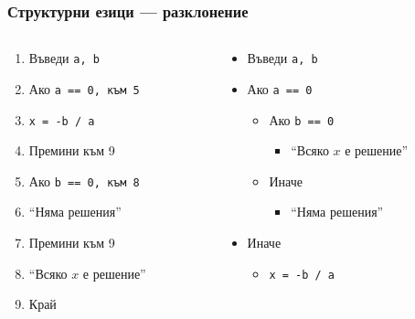 \documentclass{beamer}
\begin{document}
\begin{frame}
  \frametitle{Структурни езици — разклонение}

  \begin{columns}
    \begin{column}{.5\textwidth}
      \begin{enumerate}
      \item Въведи \tt a, \tt b
      \item Ако \tt{a == 0}, към 5
      \item \tt{x = -b / a}
      \item Премини към 9
      \item Ако \tt{b == 0}, към 8
      \item ``Няма решения''
      \item Премини към 9
      \item ``Всяко $x$ е решение''
      \item Край
      \end{enumerate}
    \end{column}
    \begin{column}{.5\textwidth}
      \begin{itemize}
      \item Въведи \tt a, \tt b
      \item Ако \tt{a == 0}
        \begin{itemize}
        \item Ако \tt{b == 0}
          \begin{itemize}
          \item ``Всяко $x$ е решение''
          \end{itemize}
        \item Иначе
          \begin{itemize}
          \item ``Няма решения''
          \end{itemize}
        \end{itemize}
      \item Иначе
        \begin{itemize}
        \item \tt{x = -b / a}
        \end{itemize}
      \end{itemize}
    \end{column}
  \end{columns}
\end{frame}
\end{document}
